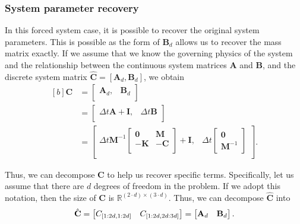 \documentclass{article}
\begin{document}
\subsubsection{System parameter recovery}\label{section:forced_parameter_recovery}

In this forced system case, it is possible to recover the original system parameters. This is possible as the form of $\mathbf{B}_d$ allows us to recover the mass matrix exactly. If we assume that we know the governing physics of the system and the relationship between the continuous system matrices $\mathbf{A}$ and $\mathbf{B}$, and the discrete system matrix $\hat{\mathbf{C}} = \left[ \mathbf{A}_d, \mathbf{B}_d \right]$, we obtain
\begin{equation}
\begin{aligned}[b]
\mathbf{C} &= 
\begin{bmatrix} 
\mathbf{A}_d, & \mathbf{B}_d \\
\end{bmatrix} \\
&= 
\begin{bmatrix} 
\Delta t \mathbf{A} + \mathbf{I}, & \Delta t \mathbf{B} \\
\end{bmatrix} \\
&= 
\begin{bmatrix} 
\Delta t \mathbf{M}^{-1}
\begin{bmatrix}
\mathbf{0} & \mathbf{M} \\
-\mathbf{K} & -\mathbf{C} \\
\end{bmatrix} + \mathbf{I}, & \Delta t \begin{bmatrix} \mathbf{0} \\ \mathbf{M}^{-1} \end{bmatrix} \\
\end{bmatrix}.
\end{aligned}
\end{equation}

Thus, we can decompose $\mathbf{C}$ to help us recover specific terms. Specifically, let us assume that there are $d$ degrees of freedom in the problem. If we adopt this notation, then the size of $\mathbf{C}$ is $\mathbb{R}^{\left( 2\cdot d \right) \times \left( 3 \cdot d \right)}$. Thus, we can decompose $\hat{\mathbf{C}}$ into
\begin{equation}
\hat{\mathbf{C}} = \begin{bmatrix} C_{[1:2d, 1:2d]} &  C_{[1:2d, 2d:3d]} \end{bmatrix}
= \begin{bmatrix} \mathbf{A}_d &  \mathbf{B}_d \end{bmatrix}. \\
\end{equation}
\end{document}
